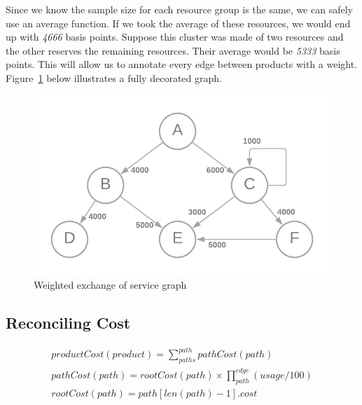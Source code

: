 \documentclass[10pt, a4paper, twocolumn]{article}
\begin{document}
    Since we know the sample size for each resource group is the same, we can safely use an average function.
    If we took the average of these resources, we would end up with \textit{4666} basis points.
    Suppose this cluster was made of two resources and the other reserves the remaining resources.
    Their average would be \textit{5333} basis points.
    This will allow us to annotate every edge between products with a weight.
    Figure~\ref{figure:3} below illustrates a fully decorated graph.

    \begin{figure}[H]
      \centering
      \includegraphics[width=\linewidth]{./truth-and-reconciliation-graph-weighted.png}
      \caption{Weighted exchange of service graph}
      \label{figure:3}
    \end{figure}

  \subsection*{Reconciling Cost}

    \begin{gather*}
        productCost(product) = \sum^{path}_{paths} pathCost(path) \\
        pathCost(path) = rootCost(path) \times \prod^{edge}_{path} (usage / 100) \\
        rootCost(path) = path[len(path) - 1].cost
    \end{gather*}
\end{document}
